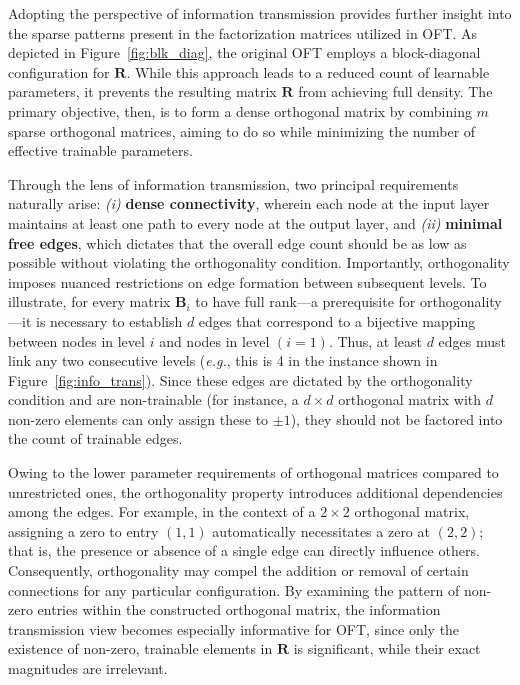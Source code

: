 Adopting the perspective of information transmission provides further insight into the sparse patterns present in the factorization matrices utilized in OFT. As depicted in Figure~\ref{fig:blk_diag}, the original OFT employs a block-diagonal configuration for $\bm{R}$. While this approach leads to a reduced count of learnable parameters, it prevents the resulting matrix $\bm{R}$ from achieving full density. The primary objective, then, is to form a dense orthogonal matrix by combining $m$ sparse orthogonal matrices, aiming to do so while minimizing the number of effective trainable parameters.

Through the lens of information transmission, two principal requirements naturally arise: \emph{(i)} \textbf{dense connectivity}, wherein each node at the input layer maintains at least one path to every node at the output layer, and \emph{(ii)} \textbf{minimal free edges}, which dictates that the overall edge count should be as low as possible without violating the orthogonality condition. Importantly, orthogonality imposes nuanced restrictions on edge formation between subsequent levels. To illustrate, for every matrix $\bm{B}_i$ to have full rank—a prerequisite for orthogonality—it is necessary to establish $d$ edges that correspond to a bijective mapping between nodes in level $i$ and nodes in level $(i=1)$. Thus, at least $d$ edges must link any two consecutive levels (\emph{e.g.}, this is 4 in the instance shown in Figure~\ref{fig:info_trans}). Since these edges are dictated by the orthogonality condition and are non-trainable (for instance, a $d\times d$ orthogonal matrix with $d$ non-zero elements can only assign these to $\pm 1$), they should not be factored into the count of trainable edges. 

Owing to the lower parameter requirements of orthogonal matrices compared to unrestricted ones, the orthogonality property introduces additional dependencies among the edges. For example, in the context of a $2\times 2$ orthogonal matrix, assigning a zero to entry $(1,1)$ automatically necessitates a zero at $(2,2)$; that is, the presence or absence of a single edge can directly influence others. Consequently, orthogonality may compel the addition or removal of certain connections for any particular configuration. By examining the pattern of non-zero entries within the constructed orthogonal matrix, the information transmission view becomes especially informative for OFT, since only the existence of non-zero, trainable elements in $\bm{R}$ is significant, while their exact magnitudes are irrelevant.

